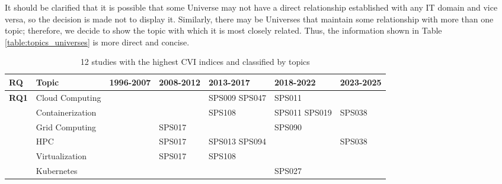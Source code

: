 It should be clarified that it is possible that some Universe may not have a direct relationship established with any IT domain and vice versa, so the decision is made not to display it. Similarly, there may be Universes that maintain some relationship with more than one topic; therefore, we decide to show the topic with which it is most closely related. Thus, the information shown in Table \ref{table:topics_universes} is more direct and concise.


\begin{table*}[htbp]
	\centering
	\caption{12 studies with the highest CVI indices and classified by topics}
	\label{table:highest_CVI}
	\renewcommand{\arraystretch}{1.2}
	\setlength{\tabcolsep}{6pt}
	\begin{tabularx}{\textwidth}{p{0.8cm}p{2.5cm}>{\raggedright\arraybackslash}X>{\raggedright\arraybackslash}X>{\raggedright\arraybackslash}X>{\raggedright\arraybackslash}X>{\raggedright\arraybackslash}X}
		\toprule
		\textbf{RQ}                          & \textbf{Topic}   & \textbf{1996-2007} & \textbf{2008-2012} & \textbf{2013-2017} & \textbf{2018-2022} & \textbf{2023-2025} \\
		\midrule
		\multirow{12}{*}[0em]{\textbf{RQ1}}  & Cloud Computing  &                    &                    & SPS009 SPS047      & SPS011             &                    \\
		\addlinespace[0.3em]
		                                     & Containerization &                    &                    & SPS108             & SPS011 SPS019      & SPS038             \\
		\addlinespace[0.3em]
		                                     & Grid Computing   &                    & SPS017             &                    & SPS090             &                    \\
		\addlinespace[0.3em]
		                                     & HPC              &                    & SPS017             & SPS013 SPS094      &                    & SPS038             \\
		\addlinespace[0.3em]
		                                     & Virtualization   &                    & SPS017             & SPS108             &                    &                    \\
		\addlinespace[0.3em]
		                                     & Kubernetes       &                    &                    &                    & SPS027             &                    \\

\end{tabularx}
\end{table*}
